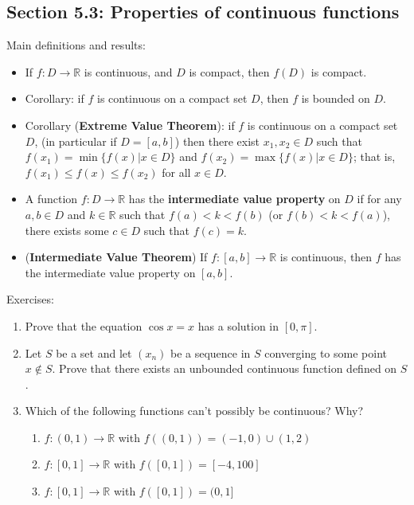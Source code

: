 \documentclass[letterpaper,12pt]{article}
\newcommand{\R}{\mathbb{R}}
\begin{document}
\subsection*{Section 5.3: Properties of continuous functions}

Main definitions and results:
\begin{itemize}
 \item If $f:D\to \R$ is continuous, and $D$ is compact, then $f(D)$ is compact.
 \item Corollary: if $f$ is continuous on a compact set $D$, then $f$ is bounded on $D$.
 \item Corollary ({\bf Extreme Value Theorem}): if $f$ is continuous on a compact set $D$, (in particular if $D=[a,b]$) then there exist $x_1,x_2\in D$ such that $f(x_1)=\min\{f(x)|x\in D\}$ and $f(x_2) = \max\{f(x)|x\in D\}$; that is, $f(x_1)\leq f(x)\leq f(x_2)$ for all $x\in D$.
 \item A function $f:D\to\R$ has the {\bf intermediate value property} on $D$ if for any $a,b\in D$ and $k\in \R$ such that $f(a)<k<f(b)$ (or $f(b)<k<f(a)$), there exists some $c\in D$ such that $f(c)=k$.
 \item ({\bf Intermediate Value Theorem}) If $f:[a,b]\to \R$ is continuous, then $f$ has the intermediate value property on $[a,b]$.
\end{itemize}

\noindent Exercises:
\begin{enumerate}
 \item Prove that the equation $\cos x = x$ has a solution in $[0,\pi]$.
 \item Let $S$ be a set and let $(x_n)$ be a sequence in $S$ converging to some point $x\notin S$. Prove that there exists an unbounded continuous function defined on $S$.
 \item Which of the following functions can't possibly be continuous? Why?
\begin{enumerate}
 \item $f:(0,1)\to \R$ with $f((0,1)) = (-1,0)\cup (1,2)$
 \item $f:[0,1]\to \R$ with $f([0,1]) = [-4,100]$
 \item $f:[0,1]\to \R$ with $f([0,1]) = (0,1]$
\end{enumerate}

\end{enumerate}
\end{document}
